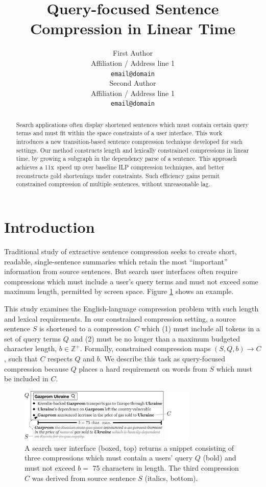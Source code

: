 \documentclass[11pt,a4paper]{article}
\title{Query-focused Sentence Compression in Linear Time}
\author{First Author \\
  Affiliation / Address line 1 \\
  {\tt email@domain} \\\And
  Second Author \\
  Affiliation / Address line 1 \\
  {\tt email@domain} \\}
\date{}
\newcommand{\speedup}[0]{11x~}
\begin{document}
\maketitle
\begin{abstract}
Search applications often display shortened sentences which must contain certain query terms and must fit within the space constraints of a user interface. This work introduces a new transition-based sentence compression technique developed for such settings. Our method constructs length and lexically constrained compressions in linear time, by growing a subgraph in the dependency parse of a sentence. This approach achieves a \speedup speed up over baseline ILP compression techniques, and better reconstructs gold shortenings under constraints. Such efficiency gains permit constrained compression of multiple sentences, without unreasonable lag.
\end{abstract}


\section{Introduction}\label{s:intro}

Traditional study of extractive sentence compression seeks to create short, readable, single-sentence summaries which retain the most ``important'' information from source sentences. But search user interfaces often require compressions which must include a user's query terms and must not exceed some maximum length, permitted by screen space.  Figure \ref{f:qf} shows an example.

This study examines the English-language compression problem with such length and lexical requirements. In our constrained compression setting, a source sentence $S$ is shortened to a compression $C$ which (1) must include all tokens in a set of query terms $Q$ and (2) must be no longer than a maximum budgeted character length, $b \in \mathbb{Z}^{+}$. Formally, constrained compression maps $(S,Q,b) \rightarrow C$, such that $C$ respects $Q$ and $b$. We describe this task as query-focused compression because $Q$ places a hard requirement on words from $S$ which must be included in $C$.

\begin{figure}[htb!]
\includegraphics[width=8.5cm]{qf.pdf}
\caption{A search user interface (boxed, top) returns a snippet consisting of three compressions which must contain a users' query $Q$ (bold) and must not exceed $b=$ 75 characters in length. The third compression $C$ was derived from source sentence $S$ (italics, bottom).}
\label{f:qf}
\end{figure}
\end{document}
